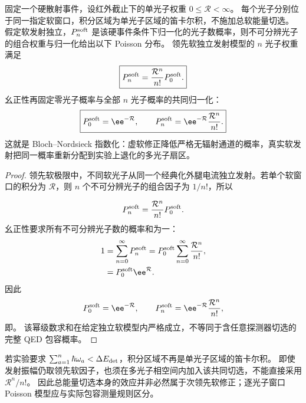 \begin{proposition}[独立软发射权重的指数归一化]
固定一个硬散射事件，设红外截止下的单光子权重 $0\le\mathcal R<\infty$。
每个光子分别位于同一指定软窗口，积分区域为单光子区域的笛卡尔积，不施加总软能量切选。
假定软发射独立，$P_n^{\rm soft}$ 是该硬事件条件下归一化的光子数概率，则不可分辨光子的组合权重与归一化给出以下 Poisson 分布。
领先软独立发射模型的 $n$ 光子权重满足
\begin{equation}
 \boxed{
 P_n^{\rm soft}=\frac{\mathcal R^n}{n!}P_0^{\rm soft}.}
 \label{eq:soft-independent-n-emission-dp68}
\end{equation}
幺正性再固定零光子概率与全部 $n$ 光子概率的共同归一化：
\begin{equation}
 \boxed{
 P_0^{\rm soft}=\ee^{-\mathcal R},
 \qquad
 P_n^{\rm soft}
 =\ee^{-\mathcal R}\frac{\mathcal R^n}{n!}.}
 \label{eq:bloch-nordsieck-exponentiation-dp10}
\end{equation}
这就是 Bloch--Nordsieck 指数化：虚软修正降低严格无辐射通道的概率，真实软发射把同一概率重新分配到实验上退化的多光子扇区。
\end{proposition}
\begin{proof}
领先软极限中，不同软光子从同一个经典化外腿电流独立发射。若单个软窗口的积分为 $\mathcal R$，则 $n$ 个不可分辨光子的组合因子为 $1/n!$，所以

\begin{equation*}
 P_n^{\rm soft}=\frac{\mathcal R^n}{n!}P_0^{\rm soft}.
\end{equation*}
幺正性要求所有不可分辨光子数的概率和为一：
\begin{align*}
 1
 &=\sum_{n=0}^{\infty}P_n^{\rm soft}
 =P_0^{\rm soft}\sum_{n=0}^{\infty}\frac{\mathcal R^n}{n!},\\
 &=P_0^{\rm soft}\ee^{\mathcal R}.
\end{align*}
因此
\begin{equation*}
 P_0^{\rm soft}=\ee^{-\mathcal R},
 \qquad
 P_n^{\rm soft}=\ee^{-\mathcal R}\frac{\mathcal R^n}{n!},
\end{equation*}
即。
该幂级数求和在给定独立软模型内严格成立，不等同于含任意探测器切选的完整 QED 包容概率。
\end{proof}

\begin{remark}[总软能量切选与独立性]
若实验要求 $\sum_{a=1}^n\hbar\omega_a<\Delta E_{\rm det}$，积分区域不再是单光子区域的笛卡尔积。
即使发射振幅仍取领先软因子，也须在多光子相空间内加入该共同切选，不能直接采用 $\mathcal R^n/n!$。
因此总能量切选本身的效应并非必然属于次领先软修正；逐光子窗口 Poisson 模型应与实际包容测量规则区分。
\end{remark}

